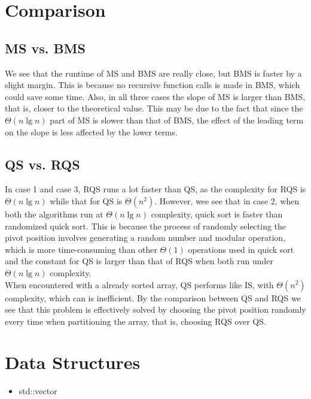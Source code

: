 \documentclass[11pt]{article}
\theoremstyle{definition}
\begin{document}
\section*{Comparison}
\subsection*{MS vs. BMS}
We see that the runtime of MS and BMS are really close, but BMS is faster by a slight margin. This is because no recursive function calls is made in BMS, which could save some time. Also, in all three cases the slope of MS is larger than BMS, that is, closer to the theoretical value. This may be due to the fact that since the $\Theta(n\lg{n})$ part of MS is slower than that of BMS, the effect of the leading term on the slope is less affected by the lower terms.
\subsection*{QS vs. RQS}
In case 1 and case 3, RQS runs a lot faster than QS, as the complexity for RQS is $\Theta(n\lg{n})$ while that for QS is $\Theta(n^2)$. However, wee see that in case 2, when both the algorithms run at $\Theta(n\lg{n})$ complexity, quick sort is faster than randomized quick sort. This is because the process of randomly selecting the pivot position involves generating a random number and modular operation, which is more time-consuming than other $\Theta(1)$ operations used in quick sort and the constant for QS is larger than that of RQS when both run under $\Theta(n\lg{n})$ complexity. \\ 
When encountered with a already sorted array, QS performs like IS, with $\Theta(n^2)$ complexity, which can is inefficient. By the comparison between QS and RQS we see that this problem is effectively solved by choosing the pivot position randomly every time when partitioning the array, that is, choosing RQS over QS.
\section*{Data Structures}
\begin{itemize}
  \item std::vector
\end{itemize}
\newpage
\end{document}
